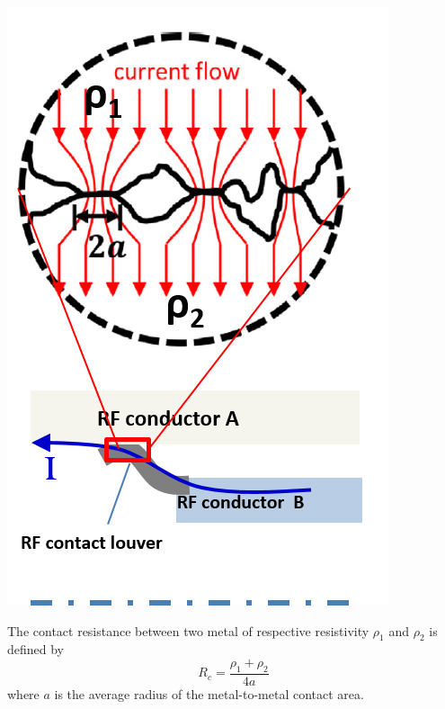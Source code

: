 {\begin{marginfigure}
	\centering
	\includegraphics[width=1.0\linewidth]{figures/chap3/RF_contacts/RF_contact_Rc}
	\caption{The contact resistance between two metal of respective resistivity $\rho_1$ and $\rho_2$ is defined by $$R_c=\frac{\rho_1+\rho_2}{4a}$$ where $a$ is the average radius of the metal-to-metal contact area\cite{holm2011}.}
	\label{fig:rfcontactrc}
\end{marginfigure}

}
